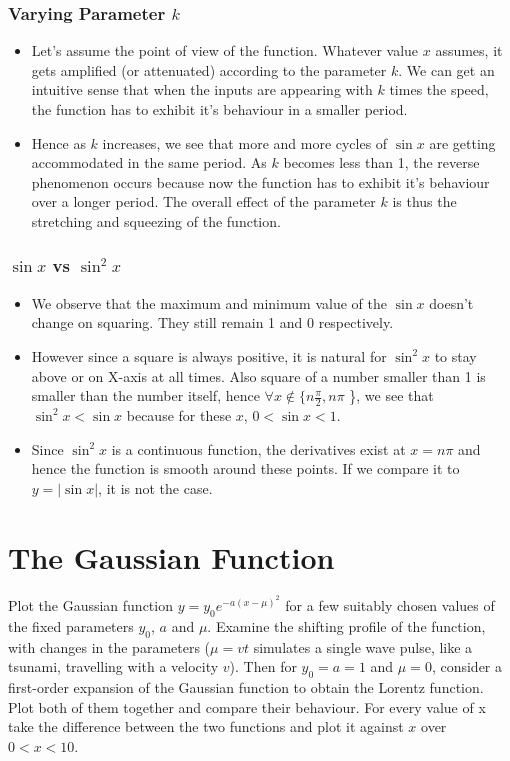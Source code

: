 \documentclass{article}
\begin{document}
\subsubsection{Varying Parameter $k$}
\begin{itemize}
    \item Let's assume the point of view of the function. Whatever value $x$ assumes, it gets amplified (or attenuated) according to the parameter $k$. We can get an intuitive sense that when the inputs are appearing with $k$ times the speed, the function has to exhibit it's behaviour in a smaller period. \item Hence as $k$ increases, we see that more and more cycles of $\sin{x}$ are getting accommodated in the same period. As $k$ becomes less than 1, the reverse phenomenon occurs because now the function has to exhibit it's behaviour over a longer period. The overall effect of the parameter $k$ is thus the stretching and squeezing of the function.
\end{itemize}

\subsubsection{$\sin{x}$ vs $\sin^2{x}$}
\begin{itemize}
    \item We observe that the maximum and minimum value of the $\sin{x}$ doesn't change on squaring. They still remain 1 and 0 respectively.
    \item However since a square is always positive, it is natural for $\sin^2{x}$ to stay above or on X-axis at all times. Also square of a number smaller than 1 is smaller than the number itself, hence $\forall x \notin \{ n\frac{\pi}{2}, n\pi$ \}, we see that $\sin^2{x} < \sin{x}$ because for these $x$, $0 < \sin{x} < 1$.
    \item Since $\sin^2{x}$ is a continuous function, the derivatives exist at $x = n\pi$ and hence the function is smooth around these points. If we compare it to $y = |\sin{x}|$, it is not the case.
\end{itemize}

\newpage
\section{The Gaussian Function}
Plot the Gaussian function $y = y_0e^{-a(x-\mu)^2}$ for a few suitably chosen values of the fixed parameters $y_0$, $a$ and $\mu$. Examine the shifting profile of the function, with changes in the parameters ($\mu = vt$ simulates a single wave pulse, like a tsunami, travelling with a velocity $v$). Then for $y_0 = a = 1$ and $\mu = 0$, consider a first-order expansion of the Gaussian function to obtain the Lorentz function. Plot both of them together and compare their behaviour. For every value of x take the difference between the two functions and plot it against $x$ over $0 < x < 10$.
\end{document}
